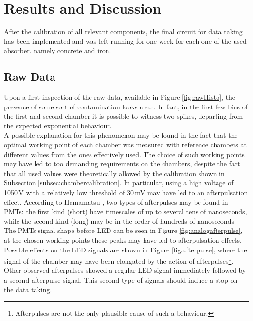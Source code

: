 \documentclass[../main.tex]{subfiles}
\begin{document}
\section{Results and Discussion} \label{sec:res} 

After the calibration of all relevant components, the final circuit for data taking has been implemented and was left running for one week for each one of the used absorber, namely concrete and iron.
\subsection{Raw Data}
Upon a first inspection of the raw data, available in Figure \ref{fig:rawHisto}, the presence of some sort of contamination looks clear. In fact, in the first few bins of the first and second chamber it is possible to witness two spikes, departing from the expected exponential behaviour.\\

A possible explanation for this phenomenon may be found in the fact that the optimal working point of each chamber was measured with reference chambers at different values from the ones effectively used. 
The choice of such working points may have led to too demanding requirements on the chambers, despite the fact that all used values were theoretically allowed by the calibration shown in Subsection \ref{subsec:chambercalibration}. In particular, using a high voltage of 1050\,V with a relatively low threshold of 30\,mV may have led to an afterpulsation effect. According to Hamamatsu \cite{hamamatsu2017pmt}, two types of afterpulses may be found in PMTs: the first kind (short) have timescales of up to several tens of nanoseconds, while the second kind (long) may be in the order of hundreds of nanoseconds.
The PMTs signal shape before LED can be seen in Figure \ref{fig:analogafterpulse}, at the chosen working points these peaks may have led to afterpulsation effects. Possible effects on the LED signals are shown in Figure \ref{fig:afterpulse}, where the signal of the chamber may have been elongated by the action of afterpulses\footnote{Afterpulses are not the only plausible cause of such a behaviour.}. Other observed afterpulses showed a regular LED signal immediately followed by a second afterpulse signal. This second type of signals should induce a stop on the data taking.\\
\end{document}
